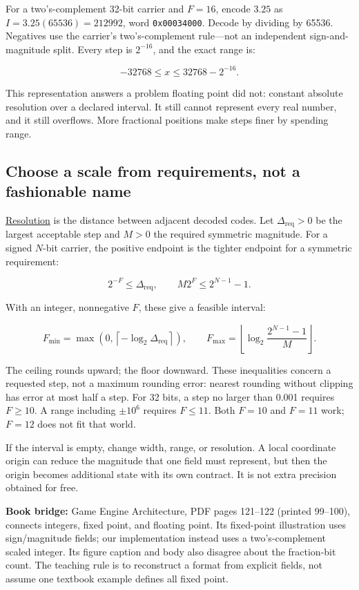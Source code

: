 For a two's-complement 32-bit carrier and \(F=16\), encode \(3.25\) as \(I=3.25(65536)=212992\), word \texttt{0x00034000}. Decode by dividing by 65536. Negatives use the carrier's two's-complement rule---not an independent sign-and-magnitude split. Every step is \(2^{-16}\), and the exact range is:

\[
-32768\le x\le32768-2^{-16}.
\]

This representation answers a problem floating point did not: constant absolute resolution over a declared interval. It still cannot represent every real number, and it still overflows. More fractional positions make steps finer by spending range.

\subsection{Choose a scale from requirements, not a fashionable name}\label{01-foundations-i-ch001-choose-a-scale-from-requirements-not-a-fashionable-name}

\hyperref[appendix-ceb4c4a9b5a1]{Resolution} is the distance between adjacent decoded codes. Let \(\Delta_{\mathrm{req}}>0\) be the largest acceptable step and \(M>0\) the required symmetric magnitude. For a signed \(N\)-bit carrier, the positive endpoint is the tighter endpoint for a symmetric requirement:

\[
2^{-F}\le\Delta_{\mathrm{req}},
\qquad
M2^F\le2^{N-1}-1.
\]

With an integer, nonnegative \(F\), these give a feasible interval:

\[
F_{\min}=\max\!\left(0,\left\lceil-\log_2\Delta_{\mathrm{req}}\right\rceil\right),
\qquad
F_{\max}=\left\lfloor\log_2\frac{2^{N-1}-1}{M}\right\rfloor.
\]

The ceiling rounds upward; the floor downward. These inequalities concern a requested step, not a maximum rounding error: nearest rounding without clipping has error at most half a step. For 32 bits, a step no larger than 0.001 requires \(F\ge10\). A range including \(\pm10^6\) requires \(F\le11\). Both \(F=10\) and \(F=11\) work; \(F=12\) does not fit that world.

If the interval is empty, change width, range, or resolution. A local coordinate origin can reduce the magnitude that one field must represent, but then the origin becomes additional state with its own contract. It is not extra precision obtained for free.

\textbf{Book bridge:} Game Engine Architecture, PDF pages 121--122 (printed 99--100), connects integers, fixed point, and floating point. Its fixed-point illustration uses sign/magnitude fields; our implementation instead uses a two's-complement scaled integer. Its figure caption and body also disagree about the fraction-bit count. The teaching rule is to reconstruct a format from explicit fields, not assume one textbook example defines all fixed point.

